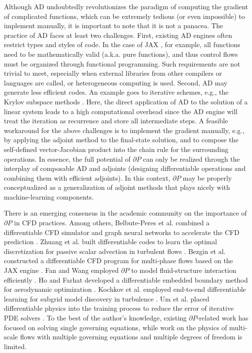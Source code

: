 \documentclass[preprint,3p,12pt,sort&compress]{elsarticle}
\begin{document}
Although AD undoubtedly revolutionizes the paradigm of computing the gradient of complicated functions, which can be extremely tedious (or even impossible) to implement manually, it is important to note that it is not a panacea.
The practice of AD faces at least two challenges.
First, existing AD engines often restrict types and styles of code.
In the case of JAX \cite{jax2018github}, for example, all functions need to be mathematically valid (a.k.a. pure functions), and thus control flows must be organized through functional programming.
Such requirements are not trivial to meet, especially when external libraries from other compilers or languages are called, or heterogeneous computing is used.
Second, AD may generate less efficient codes.
An example goes to iterative schemes, e.g., the Krylov subspace methods \cite{liesen2013krylov}.
Here, the direct application of AD to the solution of a linear system leads to a high computational overhead since the AD engine will treat the iteration as recurrence and store all intermediate steps.
A feasible workaround for the above challenges is to implement the gradient manually, e.g., by applying the adjoint method to the final-state solution, and to compose the self-defined vector-Jacobian product into the chain rule for the surrounding operations.
In essence, the full potential of $\partial P$ can only be realized through the interplay of composable AD and adjoints (designing differentiable operations and combining them with efficient adjoints). 
In this context, $\partial P$ may be properly conceptualized as a generalization of adjoint methods that plays nicely with machine-learning components.

There is an emerging consensus in the academic community on the importance of $\partial P$ in CFD practices.
Among others, Belbute-Peres et al. combined a differentiable CFD simulator and graph neural networks to accelerate the CFD prediction \cite{belbute2020combining}.
Zhuang et al. built differentiable codes to learn the optimal discretization for passive scalar advection in turbulent flows \cite{zhuang2021learned}.
Bezgin et al. constructed a differentiable CFD program for multi-phase flows based on the JAX engine \cite{bezgin2023jax}.
Fan and Wang employed $\partial P$ to model fluid-structure interaction efficiently \cite{fan2024differentiable}.
Ho and Farhat developed a differentiable embedded boundary method for aerodynamic optimization \cite{ho2023aerodynamic}.
Kochkov et al. employed end-to-end differentiable learning for subgrid model discovery in turbulence \cite{kochkov2021machine}.
Um et al. placed differentiable physics into the training process to reduce the error of iterative PDE solvers \cite{um2020solver}.
To the best of the author's knowledge, existing $\partial P$-related work has focused on solving single governing equations, while work on the physics of multi-scale flows with multiple governing equations and multiple degrees of freedom is limited.
\end{document}
